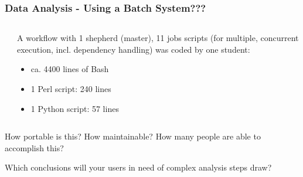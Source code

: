 \begin{frame}
	\frametitle{Data Analysis - Using a Batch System???}
	\begin{columns}
		\begin{column}{0.5\textwidth}
		\end{column}
	    \begin{column}{0.5\textwidth}
	    A workflow with 1 shepherd (master), 11 jobs scripts (for multiple, concurrent execution, incl. dependency handling) was coded by one student:
	    \begin{itemize}[<+->]
	    	\item ca. 4400 lines of Bash
	    	\item 1 Perl script: 240 lines
	    	\item 1 Python script: 57 lines
	    \end{itemize}
      
	    \end{column}	
	\end{columns}
	\vspace{-12.5em}
	\begin{columns}
		\begin{column}{0.5\textwidth}
			  \pause
			\begin{question}
				How portable is this? How maintainable? How many people are able to accomplish this?\\\pause\hline\vspace{0.5em}
				
				Which conclusions will your users in need of complex analysis steps draw?
			\end{question}	
		\end{column}
		\begin{column}{0.5\textwidth}
		\end{column}
	\end{columns}
\end{frame}	

